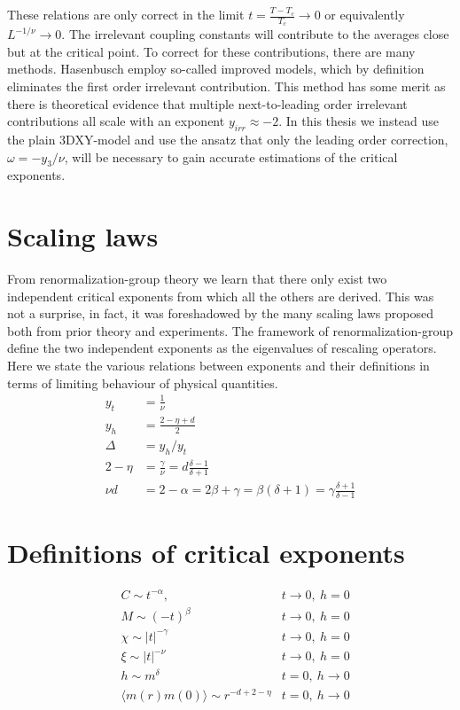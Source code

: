 These relations are only correct in the limit $t= \frac{T-T_c}{T_c} \rightarrow 0$ or equivalently $L^{-1/\nu} \rightarrow 0$.
The irrelevant coupling constants will contribute to the averages close but at the critical point.
To correct for these contributions, there are many methods. Hasenbusch employ so-called improved models, which by definition eliminates the first order irrelevant contribution.
This method has some merit as there is theoretical evidence that multiple next-to-leading order irrelevant contributions all scale with an exponent $y_{irr} \approx -2$.
In this thesis we instead use the plain 3DXY-model and use the ansatz that only the leading order correction, $\omega = -y_3/\nu$, will be necessary to gain accurate estimations of the critical exponents.
\section{Scaling laws}
From renormalization-group theory we learn that there only exist two independent critical exponents from which all the others are derived.
This was not a surprise, in fact, it was foreshadowed by the many scaling laws proposed both from prior theory and experiments.
The framework of renormalization-group define the two independent exponents as the eigenvalues of rescaling operators.
Here we state the various relations between exponents and their definitions in terms of limiting behaviour of physical quantities.
\begin{align}
  y_t &= \frac{1}{\nu}\\
  y_h &= \frac{2-\eta +d}{2}\\
  \Delta &= y_h/y_t\\
  2 - \eta &= \frac{\gamma}{\nu} = d\frac{\delta -1}{\delta+1}\\
  \nu d &= 2-\alpha = 2\beta + \gamma = \beta(\delta+1) = \gamma\frac{\delta +1}{\delta -1}
\end{align}
\section{Definitions of critical exponents}
\begin{align}
  &C \sim t^{-\alpha},                           &t\rightarrow 0, ~h=0\\
  &M \sim (-t)^{\beta}                           &t\rightarrow 0, ~h=0\\
  &\chi \sim |t|^{-\gamma}                       &t\rightarrow 0, ~h=0\\
  &\xi \sim |t|^{-\nu}                           &t\rightarrow 0, ~h=0\\
  &h \sim m^{\delta}                             &t= 0, ~h\rightarrow 0\\
  &\langle m(r)m(0)\rangle \sim r^{-d +2 -\eta}  &t= 0, ~h\rightarrow 0
  \label{}
\end{align}
